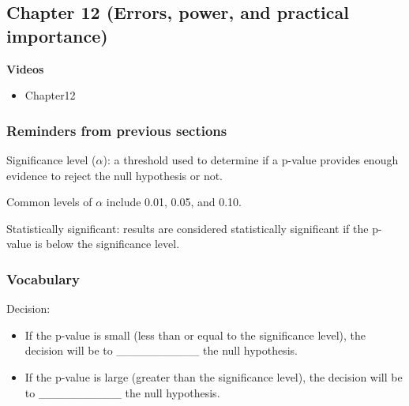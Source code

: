\documentclass[
]{report}
\providecommand{\tightlist}{%
  \setlength{\itemsep}{0pt}\setlength{\parskip}{0pt}}
\newcommand{\rgs}{\vspace{12pt}} %
\newcommand{\rgi}{\hspace{24pt}}  %
\begin{document}
\hypertarget{chapter-12-errors-power-and-practical-importance}{%
\subsection*{Chapter 12 (Errors, power, and practical importance)}\label{chapter-12-errors-power-and-practical-importance}}


\textbf{Videos}

\begin{itemize}
\tightlist
\item
  Chapter12
\end{itemize}


\hypertarget{reminders-from-previous-sections-6}{%
\subsubsection*{Reminders from previous sections}\label{reminders-from-previous-sections-6}}

Significance level (\(\alpha\)): a threshold used to determine if a p-value provides enough evidence to reject the null hypothesis or not.

\rgi Common levels of \(\alpha\) include 0.01, 0.05, and 0.10.

Statistically significant: results are considered statistically significant if the p-value is below the significance level.

\hypertarget{vocabulary-15}{%
\subsubsection*{Vocabulary}\label{vocabulary-15}}

Decision:

\rgs

\begin{itemize}
\item
  If the p-value is small (less than or equal to the significance level), the decision will be to \_\_\_\_\_\_\_\_\_\_ the null hypothesis.
\item
  If the p-value is large (greater than the significance level), the decision will be to \_\_\_\_\_\_\_\_\_\_ the null hypothesis.
\end{itemize}
\end{document}
